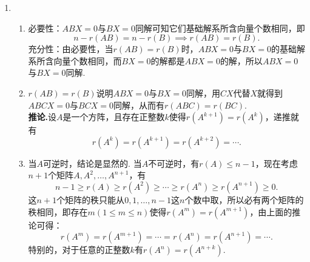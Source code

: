 \begin{enumerate}
    \item \begin{enumerate}
              \item 必要性：$ABX=0$与$BX=0$同解可知它们基础解系所含向量个数相同，即
                    \[ n-r(AB)=n-r(B)\implies r(AB)=r(B). \]
                    充分性：由必要性，当$r(AB)=r(B)$时，$ABX=0$与$BX=0$的基础解系所含向量个数相同，而$BX=0$的解都是$ABX=0$的解，所以$ABX=0$与$BX=0$同解.

              \item $r(AB)=r(B)$说明$ABX=0$与$BX=0$同解，用$CX$代替$X$就得到$ABCX=0$与$BCX=0$同解，从而有$r(ABC)=r(BC)$.\\
                    \textbf{推论.}设$A$是一个方阵，且存在正整数$k$使得$r(A^{k+1})=r(A^k)$，递推就有
                    \[ r(A^k)=r(A^{k+1})=r(A^{k+2})=\cdots. \]

              \item 当$A$可逆时，结论是显然的. 当$A$不可逆时，有$r(A)\leqslant n-1$，现在考虑$n+1$个矩阵$A,A^2,\ldots,A^{n+1}$，有
                    \[ n-1\geqslant r(A)\geqslant r(A^2)\geqslant\cdots\geqslant r(A^n)\geqslant r(A^{n+1})\geqslant 0. \]
                    这$n+1$个矩阵的秩只能从$0,1,\ldots,n-1$这$n$个数中取，所以必有两个矩阵的秩相同，即存在$m(1\leqslant m\leqslant n)$使得$r(A^m)=r(A^{m+1})$，由上面的推论可得：
                    \[ r(A^m)=r(A^{m+1})=\cdots=r(A^{n})=r(A^{n+1})=\cdots. \]
                    特别的，对于任意的正整数$k$有$r(A^n)=r(A^{n+k})$.
          \end{enumerate}


\end{enumerate}

